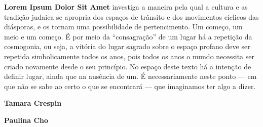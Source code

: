 \textbf{Lorem Ipsum Dolor Sit Amet} investiga a maneira pela qual a cultura e as tradição judaica se apropria dos espaços de trânsito e dos movimentos cíclicos das diásporas, e os tornam uma possibilidade de pertencimento. Um começo, um meio e um começo. É por meio da ``consagração'' de um lugar há a repetição da cosmogonia, ou seja, a vitória do lugar sagrado sobre o espaço profano deve ser repetida simbolicamente todos os anos, pois todos os anos o mundo necessita ser criado novamente desde o seu princípio. No espaço deste texto há a intenção de definir lugar, ainda que na ausência de um. É necessariamente neste ponto --- em que não se sabe ao certo o que se encontrará --- que imaginamos ter algo a dizer. 


\textbf{Tamara Crespin} \lipsum[2]

\textbf{Paulina Cho} \lipsum[2]

